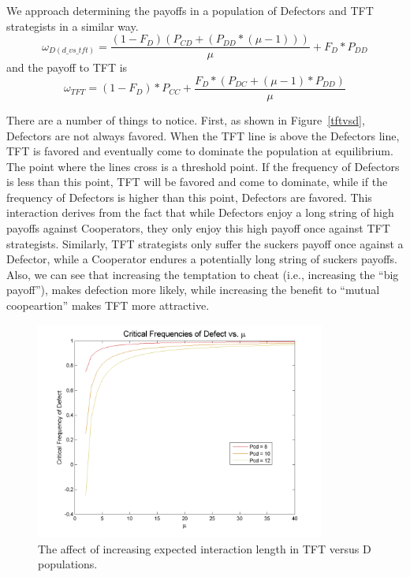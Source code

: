 \documentclass[11pt]{article} %
\begin{document}
We approach determining the payoffs in a population of Defectors and TFT strategists in a similar way.
\begin{equation}
	\omega_{D(d\_vs\_tft)} = \frac{(1 - F_{D})(P_{CD} + (P_{DD} * (\mu - 1)))}{\mu} + F_D * P_{DD}
	\label{d_in_dvstft}
\end{equation}
and  the payoff to TFT is
\begin{equation}
	\omega_{TFT} = (1-F_{D}) * P_{CC} + \frac{F_{D} * (P_{DC} + (\mu - 1) * P_{DD})}{\mu}
	\label{tft_in_dvstft}
\end{equation}

There are a number of things to notice. First, as shown in Figure~\ref{tftvsd}, Defectors are not always favored. When the TFT line is above the Defectors line, TFT is favored and eventually come to dominate the population at equilibrium. The point where the lines cross is a threshold point. If the frequency of Defectors is less than this point, TFT will be favored and come to dominate, while if the frequency of Defectors is higher than this point, Defectors are favored. This interaction derives from the fact that while Defectors enjoy a long string of high payoffs against Cooperators, they only enjoy this high payoff once against TFT strategists. Similarly, TFT strategists only suffer the suckers payoff once against a Defector, while a Cooperator endures a potentially long string of suckers payoffs.  Also, we can see that increasing the temptation to cheat (i.e., increasing the ``big payoff''), makes defection more likely, while increasing the benefit to ``mutual coopeartion'' makes TFT more attractive. 

\begin{figure}[ht]
	\centering
	\includegraphics[width=0.85\textwidth]{files/figures/fdcrit.png}
	\caption{The affect of increasing expected interaction length in TFT versus D populations.}
	\label{muintft}
\end{figure}
\end{document}
